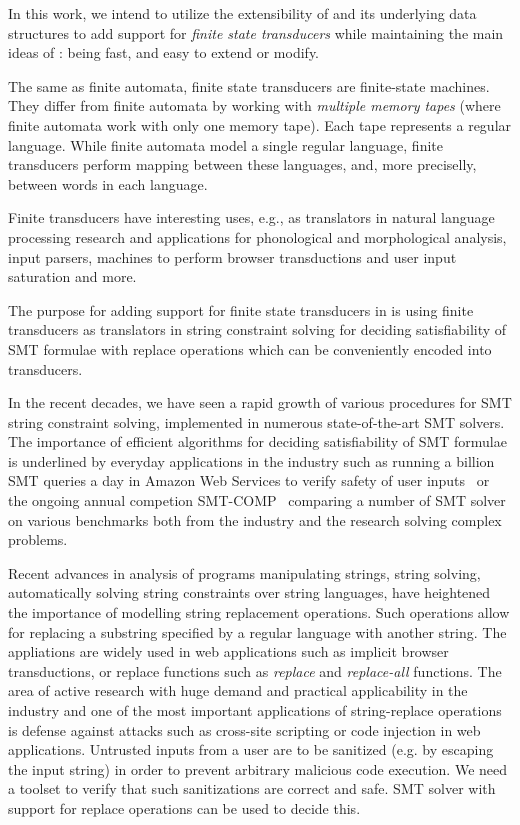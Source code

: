 In this work, we intend to utilize the extensibility of \mata and its underlying data structures to add support for \emph{finite state transducers} while maintaining the main ideas of \mata: being fast, and easy to extend or modify.

The same as finite automata, finite state transducers are finite-state machines.
They differ from finite automata by working with \emph{multiple memory tapes} (where finite automata work with only one memory tape).
Each tape represents a regular language.
While finite automata model a single regular language, finite transducers perform mapping between these languages, and, more preciselly, between words in each language.

Finite transducers have interesting uses, e.g., as translators in natural language processing research and applications for phonological and morphological analysis, input parsers, machines to perform browser transductions and user input saturation and more.

The purpose for adding support for finite state transducers in \mata is using finite transducers as translators in string constraint solving for deciding satisfiability of SMT formulae with replace operations which can be conveniently encoded into transducers.

In the recent decades, we have seen a rapid growth of various procedures for SMT string constraint solving, implemented in numerous state-of-the-art SMT solvers.
The importance of efficient algorithms for deciding satisfiability of SMT formulae is underlined by everyday applications in the industry such as running a billion SMT queries a day in Amazon Web Services to verify safety of user inputs~\cite{Rungta2022} or the ongoing annual competion SMT-COMP~\cite{smt_comp} comparing a number of SMT solver on various benchmarks both from the industry and the research solving complex problems.

Recent advances in analysis of programs manipulating strings, string solving, automatically solving string constraints over string languages, have heightened the importance of modelling string replacement operations.
Such operations allow for replacing a substring specified by a regular language with another string.
The appliations are widely used in web applications such as implicit browser transductions, or replace functions such as \emph{replace} and \emph{replace-all} functions.
The area of active research with huge demand and practical applicability in the industry and one of the most important applications of string-replace operations is defense against attacks such as cross-site scripting or code injection in web applications.
Untrusted inputs from a user are to be sanitized (e.g. by escaping the input string) in order to prevent arbitrary malicious code execution.
We need a toolset to verify that such sanitizations are correct and safe.
SMT solver with support for replace operations can be used to decide this.

